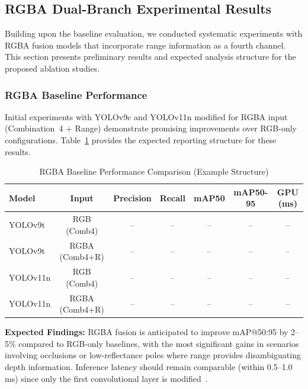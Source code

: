 \documentclass[runningheads]{llncs}
\begin{document}
\subsection{RGBA Dual-Branch Experimental Results}
\label{sec:rgba_results}

Building upon the baseline evaluation, we conducted systematic experiments with RGBA fusion models that incorporate range information as a fourth channel. This section presents preliminary results and expected analysis structure for the proposed ablation studies.

\subsubsection{RGBA Baseline Performance}

Initial experiments with YOLOv9c and YOLOv11n modified for RGBA input (Combination~4 + Range) demonstrate promising improvements over RGB-only configurations. Table~\ref{tab:rgba_baseline} provides the expected reporting structure for these results.

\begin{table}[h!]
    \centering
    \caption{RGBA Baseline Performance Comparison (Example Structure)}
    \label{tab:rgba_baseline}
    \begin{tabular}{lcccccc}
        \toprule
        \textbf{Model} & \textbf{Input} & \textbf{Precision} & \textbf{Recall} & \textbf{mAP50} & \textbf{mAP50-95} & \textbf{GPU (ms)} \\
        \midrule
        YOLOv9t & RGB (Comb4)   & -- & -- & -- & -- & -- \\
        YOLOv9t & RGBA (Comb4+R) & -- & -- & -- & -- & -- \\
        \midrule
        YOLOv11n & RGB (Comb4)   & -- & -- & -- & -- & -- \\
        YOLOv11n & RGBA (Comb4+R) & -- & -- & -- & -- & -- \\
        \bottomrule
    \end{tabular}
\end{table}



\textbf{Expected Findings:} RGBA fusion is anticipated to improve mAP@50:95 by 2--5\% compared to RGB-only baselines, with the most significant gains in scenarios involving occlusions or low-reflectance poles where range provides disambiguating depth information. Inference latency should remain comparable (within 0.5--1.0 ms) since only the first convolutional layer is modified~\cite{wang2024yolov9}.
\end{document}
